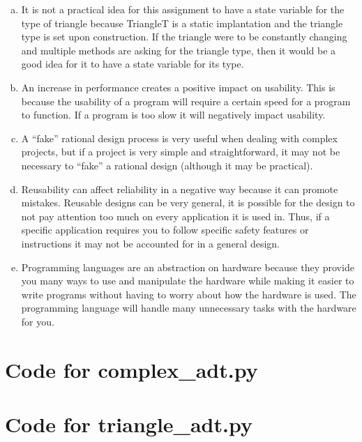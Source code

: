 \documentclass[12pt]{article}
\begin{document}
\begin{enumerate}[(a)]
\item It is not a practical idea for this assignment to have a state variable for the type of triangle because TriangleT is a static implantation and the triangle type is set upon construction. If the triangle were to be constantly changing and multiple methods are asking for the triangle type, then it would be a good idea for it to have a state variable for its type.
\item An increase in performance creates a positive impact on usability. This is because the usability of a program will require a certain speed for a program to function. If a program is too slow it will negatively impact usability.
\item A “fake” rational design process is very useful when dealing with complex projects, but if a project is very simple and straightforward, it may not be necessary to “fake” a rational design (although it may be practical). 
\item Reusability can affect reliability in a negative way because it can promote mistakes. Reusable designs can be very general, it is possible for the design to not pay attention too much on every application it is used in. Thus, if a specific application requires you to follow specific safety features or instructions it may not be accounted for in a general design.
\item Programming languages are an abstraction on hardware because they provide you many ways to use and manipulate the hardware while making it easier to write programs without having to worry about how the hardware is used. The programming language will handle many unnecessary tasks with the hardware for you.

\end{enumerate}

\newpage

\lstset{language=Python, basicstyle=\tiny, breaklines=true, showspaces=false,
  showstringspaces=false, breakatwhitespace=true}

\def\thesection{\Alph{section}}

\section{Code for complex\_adt.py}

\noindent 

\newpage

\section{Code for triangle\_adt.py}
\end{document}
